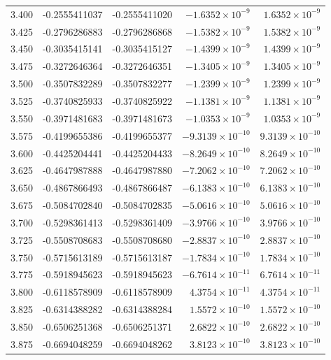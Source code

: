 \documentclass[11pt,a4paper]{article}
\begin{document}
\begin{longtable}{rrrrr}
3.400 & -0.2555411037 & -0.2555411020 & $-1.6352\times 10^{-9}$ & $1.6352\times 10^{-9}$ \\
3.425 & -0.2796286883 & -0.2796286868 & $-1.5382\times 10^{-9}$ & $1.5382\times 10^{-9}$ \\
3.450 & -0.3035415141 & -0.3035415127 & $-1.4399\times 10^{-9}$ & $1.4399\times 10^{-9}$ \\
3.475 & -0.3272646364 & -0.3272646351 & $-1.3405\times 10^{-9}$ & $1.3405\times 10^{-9}$ \\
3.500 & -0.3507832289 & -0.3507832277 & $-1.2399\times 10^{-9}$ & $1.2399\times 10^{-9}$ \\
3.525 & -0.3740825933 & -0.3740825922 & $-1.1381\times 10^{-9}$ & $1.1381\times 10^{-9}$ \\
3.550 & -0.3971481683 & -0.3971481673 & $-1.0353\times 10^{-9}$ & $1.0353\times 10^{-9}$ \\
3.575 & -0.4199655386 & -0.4199655377 & $-9.3139\times 10^{-10}$ & $9.3139\times 10^{-10}$ \\
3.600 & -0.4425204441 & -0.4425204433 & $-8.2649\times 10^{-10}$ & $8.2649\times 10^{-10}$ \\
3.625 & -0.4647987888 & -0.4647987880 & $-7.2062\times 10^{-10}$ & $7.2062\times 10^{-10}$ \\
3.650 & -0.4867866493 & -0.4867866487 & $-6.1383\times 10^{-10}$ & $6.1383\times 10^{-10}$ \\
3.675 & -0.5084702840 & -0.5084702835 & $-5.0616\times 10^{-10}$ & $5.0616\times 10^{-10}$ \\
3.700 & -0.5298361413 & -0.5298361409 & $-3.9766\times 10^{-10}$ & $3.9766\times 10^{-10}$ \\
3.725 & -0.5508708683 & -0.5508708680 & $-2.8837\times 10^{-10}$ & $2.8837\times 10^{-10}$ \\
3.750 & -0.5715613189 & -0.5715613187 & $-1.7834\times 10^{-10}$ & $1.7834\times 10^{-10}$ \\
3.775 & -0.5918945623 & -0.5918945623 & $-6.7614\times 10^{-11}$ & $6.7614\times 10^{-11}$ \\
3.800 & -0.6118578909 & -0.6118578909 & $4.3754\times 10^{-11}$ & $4.3754\times 10^{-11}$ \\
3.825 & -0.6314388282 & -0.6314388284 & $1.5572\times 10^{-10}$ & $1.5572\times 10^{-10}$ \\
3.850 & -0.6506251368 & -0.6506251371 & $2.6822\times 10^{-10}$ & $2.6822\times 10^{-10}$ \\
3.875 & -0.6694048259 & -0.6694048262 & $3.8123\times 10^{-10}$ & $3.8123\times 10^{-10}$ \\

\end{longtable}
\end{document}
